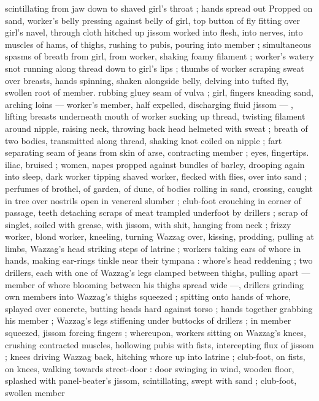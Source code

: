 scintillating from jaw down to shaved girl's throat ; hands spread out
Propped on sand, worker's belly pressing against belly of girl, top
button of fly fitting over girl's navel, through cloth hitched up
jissom worked into flesh, into nerves, into muscles of hams, of
thighs, rushing to pubis, pouring into member ; simultaneous spasms
of breath from girl, from worker, shaking foamy filament ; worker's
watery snot running along thread down to girl's lips ; thumbs of
worker scraping sweat over breasts, hands spinning, shaken
alongside belly, delving into tufted fly, swollen root of member.
rubbing gluey seam of vulva ; girl, fingers kneading sand, arching
loins --- worker's member, half expelled, discharging fluid jissom ---
, lifting breasts underneath mouth of worker sucking up thread,
twisting filament around nipple, raising neck, throwing back head
helmeted with sweat ; breath of two bodies, transmitted along
thread, shaking knot coiled on nipple ; fart separating seam of jeans
from skin of arse, contracting member ; eyes, fingertips. iliac,
bruised ; women, napes propped against bundles of barley, drooping
again into sleep, dark worker tipping shaved worker, flecked with
flies, over into sand ; perfumes of brothel, of garden, of dune, of
bodies rolling in sand, crossing, caught in tree over nostrils open in
venereal slumber ; club-foot crouching in corner of passage, teeth
detaching scraps of meat trampled underfoot by drillers ; scrap of
singlet, soiled with grease, with jissom, with shit, hanging from neck
; frizzy worker, blond worker, kneeling, turning Wazzag over, kissing,
prodding, pulling at limbs, Wazzag’s head striking steps of latrine ;
workers taking ears of whore in hands, making ear-rings tinkle near
their tympana : whore's head reddening ; two drillers, each with one
of Wazzag's legs clamped between thighs, pulling apart --- member
of whore blooming between his thighs spread wide ---, drillers
grinding own members into Wazzag’s thighs squeezed ; spitting onto
hands of whore, splayed over concrete, butting heads hard against
torso ; hands together grabbing his member ; Wazzag’s legs
stiffening under buttocks of drillers ; in member squeezed, jissom
forcing fingers ; whereupon, workers sitting on Wazzag's knees,
crushing contracted muscles, hollowing pubis with fists, intercepting
flux of jissom ; knees driving Wazzag back, hitching whore up into
latrine ; club-foot, on fists, on knees, walking towards street-door :
door swinging in wind, wooden floor, splashed with panel-beater's
jissom, scintillating, swept with sand ; club-foot, swollen member
